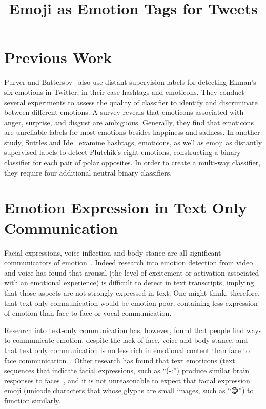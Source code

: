 \documentclass[10pt, a4paper]{article}
\title{Emoji as Emotion Tags for Tweets}
\begin{document}
\maketitleabstract

\section{Previous Work}
Purver and Battersby~ also use distant supervision labels for detecting Ekman’s six emotions in Twitter, in their case hashtags and emoticons. They conduct several experiments to assess the quality of classifier to identify and discriminate between different emotions. A survey reveals that emoticons associated with anger, surprise, and disgust are ambiguous. Generally, they find that emoticons are unreliable labels for most emotions besides happiness and sadness.
In another study, Suttles and Ide~ examine hashtags, emoticons, as well as emoji as distantly supervised labels to detect Plutchik’s eight emotions, constructing a binary classifier for each pair of polar opposites. In order to create a multi-way classifier, they require four additional neutral binary classifiers. 

\section{Emotion Expression in Text Only Communication}
\label{sec:emotion_expression_in_text_only_communication}
Facial expressions, voice inflection and body stance are all significant communicators of emotion~\cite{Johnston2015Apa}. 
Indeed research into emotion detection from video and voice has found that arousal (the level of excitement or activation associated with an emotional experience) is 
difficult to detect in text transcripts, implying that those aspects are not strongly expressed in text.
One might think, therefore, that text-only communication would be emotion-poor, containing less expression of emotion than face to face or vocal communication.

Research into text-only communication has, however, found that people find ways to communicate emotion, despite the lack of face, voice and body stance, and that text only communication is no less rich in emotional content than face to face communication~\cite{Derks2008Role}.
Other research has found that text emoticons (text sequences that indicate facial expressions, such as ``(-:'') produce similar brain responses to faces~\cite{Churches2014Emoticons}, and it is not unreasonable to expect that facial expression emoji (unicode characters that whose glyphs are small images, such as ``😅'') to function similarly.
\end{document}
